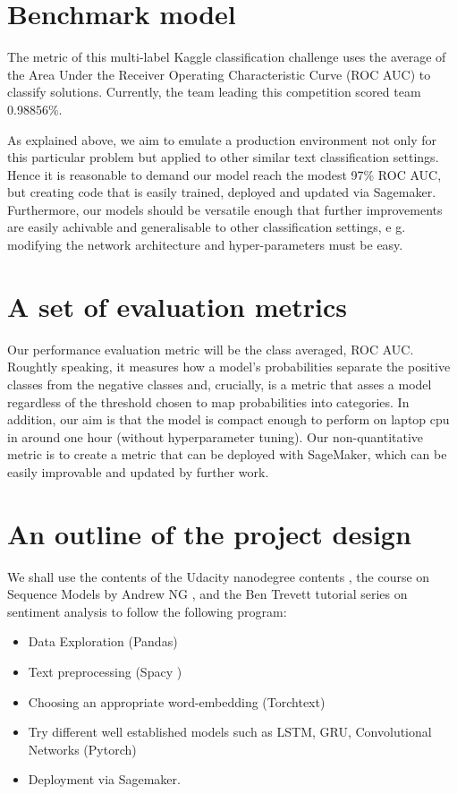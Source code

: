 \documentclass[book,preprintnumbers,11pt]{article}
\begin{document}
\section{Benchmark model}

The metric of this multi-label Kaggle classification challenge 
uses the average of the  Area Under the Receiver Operating Characteristic Curve (ROC AUC) to 
 classify solutions. Currently, the team leading this competition scored team 0.98856\%.

As explained above, we aim to emulate a production 
environment not only for this particular problem but applied to other similar text
classification settings. Hence it is reasonable to demand our model reach the modest 97\% ROC AUC, 
but creating code that is easily trained, deployed and updated via Sagemaker. Furthermore, our 
models should be versatile enough that further improvements are easily achivable and 
generalisable to other classification settings, e g. modifying the network architecture and hyper-parameters 
must be easy.

\section{A set of evaluation metrics}

Our performance evaluation metric will be the class averaged, ROC AUC. Roughtly speaking, it measures 
how a model's probabilities separate the positive classes  from the negative classes and, crucially,
is a metric that asses a model regardless of the threshold chosen to map probabilities into categories. In addition, our aim 
is that the model is compact enough to perform on laptop cpu in around one hour (without hyperparameter tuning). 
Our non-quantitative metric is to create a metric that can be deployed with SageMaker, which can be easily improvable and updated by further work.


\section{An outline of the project design}

We shall use the contents of the Udacity nanodegree contents \cite{ND}, 
the course on Sequence Models by Andrew NG \cite{NG}, and the 
Ben Trevett tutorial  series on sentiment analysis \cite{BT} to follow the following program:
\begin{itemize}
\item Data Exploration (Pandas)
\item Text preprocessing (Spacy \cite{Spacy})
\item Choosing an appropriate word-embedding (Torchtext)
\item Try different well established models such as LSTM, GRU, Convolutional Networks (Pytorch)
\item Deployment via Sagemaker.
\end{itemize}



\end{document}

